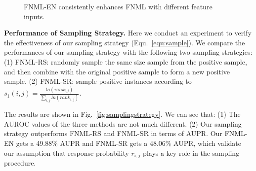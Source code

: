 \documentclass[conference]{IEEEtran}
\begin{document}
\begin{figure}[!ht]
\centering
{}

\vspace*{-10pt}
\caption{FNML-EN consistently enhances FNML with different feature inputs.}\label{fig:stability-EN}
\end{figure}

\textbf{Performance of Sampling Strategy.} 
Here we conduct an experiment to verify the effectiveness of our sampling strategy (Equ.~\ref{equ:sample}).  We compare the performances of our sampling strategy with the following two sampling strategies: (1) FNML-RS: randomly sample the same size sample from the positive sample, and then combine with the original positive sample to form a new positive sample.  (2) FNML-SR: sample positive instances according to $
s_{1}(i,j) = \frac{ln(rank_{i,j})}{\sum_{i,j}{ln(rank_{i,j})}}$. 

The results are shown in Fig.~\ref{fig:samplingstrategy}. We can see that: (1) The AUROC values of the three methods are not much different. (2) Our sampling strategy outperforms FNML-RS and FNML-SR in terms of AUPR. Our FNML-EN gets a 49.88\% AUPR and FNML-SR gets a 48.06\% AUPR, which validate our assumption that response probability $r_{i,j}$ plays a key role in the sampling procedure.
\end{document}

